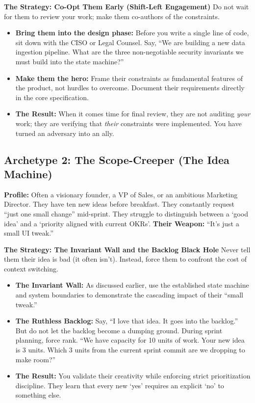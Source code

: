 \textbf{The Strategy: Co-Opt Them Early (Shift-Left Engagement)} Do not
wait for them to review your work; make them co-authors of the
constraints.

\begin{itemize}
\tightlist
\item
  \textbf{Bring them into the design phase:} Before you write a single
  line of code, sit down with the CISO or Legal Counsel. Say, ``We are
  building a new data ingestion pipeline. What are the three
  non-negotiable security invariants we must build into the state
  machine?''
\item
  \textbf{Make them the hero:} Frame their constraints as fundamental
  features of the product, not hurdles to overcome. Document their
  requirements directly in the core specification.
\item
  \textbf{The Result:} When it comes time for final review, they are not
  auditing \emph{your} work; they are verifying that \emph{their}
  constraints were implemented. You have turned an adversary into an
  ally.
\end{itemize}

\subsection{Archetype 2: The Scope-Creeper (The Idea
Machine)}\label{archetype-2-the-scope-creeper-the-idea-machine}

\textbf{Profile:} Often a visionary founder, a VP of Sales, or an
ambitious Marketing Director. They have ten new ideas before breakfast.
They constantly request ``just one small change'' mid-sprint. They
struggle to distinguish between a `good idea' and a `priority aligned
with current OKRs'. \textbf{Their Weapon:} ``It's just a small UI
tweak.''

\textbf{The Strategy: The Invariant Wall and the Backlog Black Hole}
Never tell them their idea is bad (it often isn't). Instead, force them
to confront the cost of context switching.

\begin{itemize}
\tightlist
\item
  \textbf{The Invariant Wall:} As discussed earlier, use the established
  state machine and system boundaries to demonstrate the cascading
  impact of their ``small tweak.''
\item
  \textbf{The Ruthless Backlog:} Say, ``I love that idea. It goes into
  the backlog.'' But do not let the backlog become a dumping ground.
  During sprint planning, force rank. ``We have capacity for 10 units of
  work. Your new idea is 3 units. Which 3 units from the current sprint
  commit are we dropping to make room?''
\item
  \textbf{The Result:} You validate their creativity while enforcing
  strict prioritization discipline. They learn that every new `yes'
  requires an explicit `no' to something else.
\end{itemize}

